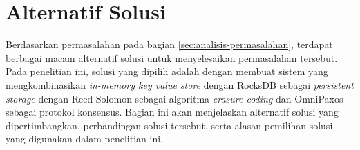\section{Alternatif Solusi}
\label{sec:alternatif-solusi}

Berdasarkan permasalahan pada bagian \ref{sec:analisis-permasalahan}, terdapat berbagai macam alternatif solusi untuk menyelesaikan permasalahan tersebut. Pada penelitian ini, solusi yang dipilih adalah dengan membuat sistem yang mengkombinasikan \textit{in-memory key value store} dengan RocksDB sebagai \textit{persistent storage} dengan Reed-Solomon sebagai algoritma \textit{erasure coding} dan OmniPaxos sebagai protokol konsensus. Bagian ini akan menjelaskan alternatif solusi yang dipertimbangkan, perbandingan solusi tersebut, serta alasan pemilihan solusi yang digunakan dalam penelitian ini.





